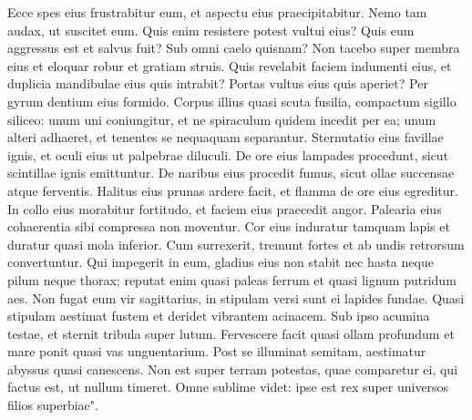\begin{biblechapter}  
\verse Ecce spes eius frustrabitur eum, et aspectu eius praecipitabitur. 
\verse Nemo tam audax, ut suscitet eum. Quis enim resistere potest vultui eius? 
\verse Quis eum aggressus est et salvus fuit? Sub omni caelo quisnam? 
\verse Non tacebo super membra eius et eloquar robur et gratiam struis. 
\verse Quis revelabit faciem indumenti eius, et duplicia mandibulae eius quis intrabit? 
\verse Portas vultus eius quis aperiet? Per gyrum dentium eius formido. 
\verse Corpus illius quasi scuta fusilia, compactum sigillo siliceo: 
\verse unum uni coniungitur, et ne spiraculum quidem incedit per ea; 
\verse unum alteri adhaeret, et tenentes se nequaquam separantur. 
\verse Sternutatio eius favillae ignis, et oculi eius ut palpebrae diluculi. 
\verse De ore eius lampades procedunt, sicut scintillae ignis emittuntur. 
\verse De naribus eius procedit fumus, sicut ollae succensae atque ferventis. 
\verse Halitus eius prunas ardere facit, et flamma de ore eius egreditur. 
\verse In collo eius morabitur fortitudo, et faciem eius praecedit angor. 
\verse Palearia eius cohaerentia sibi compressa non moventur. 
\verse Cor eius induratur tamquam lapis et duratur quasi mola inferior. 
\verse Cum surrexerit, tremunt fortes et ab undis retrorsum convertuntur. 
\verse Qui impegerit in eum, gladius eius non stabit nec hasta neque pilum neque thorax; 
\verse reputat enim quasi paleas ferrum et quasi lignum putridum aes. 
\verse Non fugat eum vir sagittarius, in stipulam versi sunt ei lapides fundae. 
\verse Quasi stipulam aestimat fustem et deridet vibrantem acinacem. 
\verse Sub ipso acumina testae, et sternit tribula super lutum. 
\verse Fervescere facit quasi ollam profundum et mare ponit quasi vas unguentarium. 
\verse Post se illuminat semitam, aestimatur abyssus quasi canescens. 
\verse Non est super terram potestas, quae comparetur ei, qui factus est, ut nullum timeret. 
\verse Omne sublime videt: ipse est rex super universos filios superbiae". 
\end{biblechapter}

